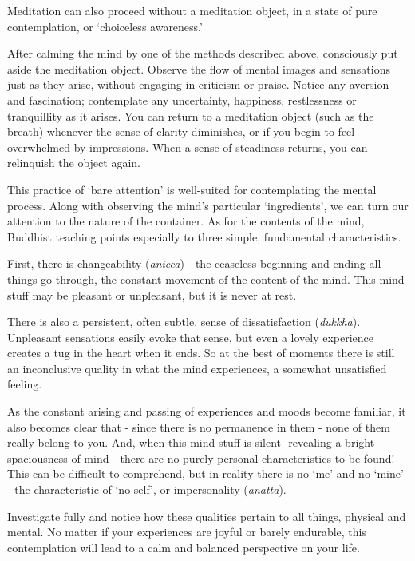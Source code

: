 
Meditation can also proceed without a meditation object, in a state of
pure contemplation, or `choiceless awareness.'

After calming the mind by one of the methods described above,
consciously put aside the meditation object. Observe the flow of mental
images and sensations just as they arise, without engaging in criticism
or praise. Notice any aversion and fascination; contemplate any
uncertainty, happiness, restlessness or tranquillity as it arises. You
can return to a meditation object (such as the breath) whenever the
sense of clarity diminishes, or if you begin to feel overwhelmed by
impressions. When a sense of steadiness returns, you can relinquish the
object again.

This practice of `bare attention' is well-suited for contemplating the
mental process. Along with observing the mind's particular
`ingredients', we can turn our attention to the nature of the container.
As for the contents of the mind, Buddhist teaching points especially to
three simple, fundamental characteristics.

First, there is changeability (\emph{anicca}) - the ceaseless beginning
and ending all things go through, the constant movement of the content
of the mind. This mind-stuff may be pleasant or unpleasant, but it is
never at rest.

There is also a persistent, often subtle, sense of dissatisfaction
(\emph{dukkha}). Unpleasant sensations easily evoke that sense, but even
a lovely experience creates a tug in the heart when it ends. So at the
best of moments there is still an inconclusive quality in what the mind
experiences, a somewhat unsatisfied feeling.

As the constant arising and passing of experiences and moods become
familiar, it also becomes clear that - since there is no permanence in
them - none of them really belong to you. And, when this mind-stuff is
silent- revealing a bright spaciousness of mind - there are no purely
personal characteristics to be found! This can be difficult to
comprehend, but in reality there is no `me' and no `mine' - the
characteristic of `no-self', or impersonality (\emph{anattā}).

Investigate fully and notice how these qualities pertain to all things,
physical and mental. No matter if your experiences are joyful or barely
endurable, this contemplation will lead to a calm and balanced
perspective on your life.

